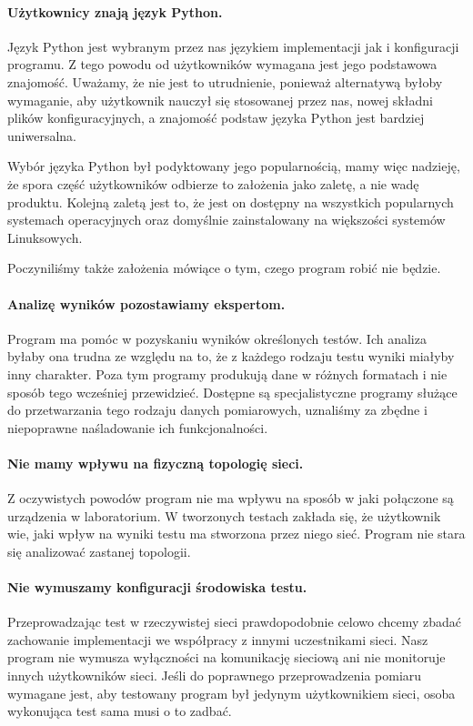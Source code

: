 \documentclass[00-praca-magisterska.tex]{subfiles}
\begin{document}
\paragraph{Użytkownicy znają język Python.} Język Python jest wybranym przez nas
językiem implementacji jak i konfiguracji programu. Z tego powodu od
użytkowników wymagana jest jego podstawowa znajomość. Uważamy, że nie jest to
utrudnienie, ponieważ alternatywą byłoby wymaganie, aby użytkownik nauczył się
stosowanej przez nas, nowej składni plików konfiguracyjnych, a znajomość podstaw
języka Python jest bardziej uniwersalna.

Wybór języka Python był podyktowany jego popularnością, mamy więc nadzieję, że
spora część użytkowników odbierze to założenia jako zaletę, a nie wadę
produktu. Kolejną zaletą jest to, że jest on dostępny na wszystkich popularnych
systemach operacyjnych oraz domyślnie zainstalowany na większości systemów
Linuksowych.

Poczyniliśmy także założenia mówiące o tym, czego program robić nie będzie.

\paragraph{Analizę wyników pozostawiamy ekspertom.} Program ma pomóc w
pozyskaniu wyników określonych testów. Ich analiza byłaby ona trudna ze
względu na to, że z każdego rodzaju testu wyniki miałyby inny charakter. Poza
tym programy produkują dane w różnych formatach i nie sposób tego wcześniej
przewidzieć. Dostępne są specjalistyczne programy służące do przetwarzania tego
rodzaju danych pomiarowych, uznaliśmy za zbędne i niepoprawne naśladowanie ich
funkcjonalności.

\paragraph{Nie mamy wpływu na fizyczną topologię sieci.} Z oczywistych powodów
program nie ma wpływu na sposób w jaki połączone są urządzenia w laboratorium. W
tworzonych testach zakłada się, że użytkownik wie, jaki wpływ na wyniki testu ma
stworzona przez niego sieć. Program nie stara się analizować zastanej topologii.

\paragraph{Nie wymuszamy konfiguracji środowiska testu.} Przeprowadzając test w
rzeczywistej sieci prawdopodobnie celowo chcemy zbadać zachowanie implementacji
we współpracy z innymi uczestnikami sieci. Nasz program nie wymusza wyłączności
na komunikację sieciową ani nie monitoruje innych użytkowników sieci. Jeśli do
poprawnego przeprowadzenia pomiaru wymagane jest, aby testowany program był
jedynym użytkownikiem sieci, osoba wykonująca test sama musi o to zadbać.
\end{document}
